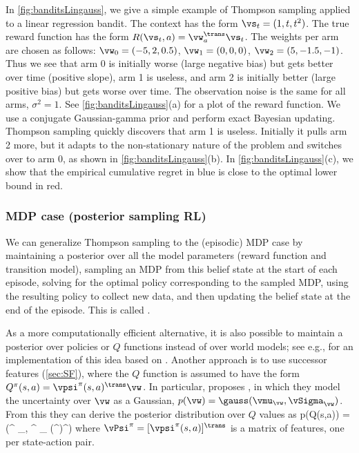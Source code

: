 In \cref{fig:banditsLingauss}, we give a simple
example of Thompson sampling applied to a linear regression bandit.
The context has the form $\vs_t =(1,t,t^2)$.
The true reward function has the form
$R(\vs_t,a) = \vw_a^\trans \vs_t$.
The weights per arm are chosen as follows:
$\vw_0 = (-5, 2, 0.5)$,
$\vw_1 = (0,0,0)$,
$\vw_2 = (5, -1.5, -1)$.
Thus we see that arm 0 is initially worse (large negative bias)
but gets better over time (positive slope),
arm 1 is useless,
and arm 2 is initially better (large positive bias)
but gets worse over time.
The observation noise is the same for all arms, $\sigma^2=1$.
See \cref{fig:banditsLingauss}(a) for a plot of the reward function.
We use a conjugate Gaussian-gamma prior and perform
exact Bayesian updating. Thompson sampling
quickly discovers that arm 1 is useless.
Initially it pulls arm 2  more,
but it adapts to the non-stationary nature of the problem
and switches over to arm 0,
as shown in 
\cref{fig:banditsLingauss}(b).
In \cref{fig:banditsLingauss}(c), we show that the empirical
cumulative regret in blue is close to the optimal
lower bound in red.

\subsubsection{MDP case (posterior sampling RL)}
\label{sec:PSRL}

We can generalize Thompson sampling to the (episodic) MDP case
by maintaining a posterior over all the model parameters
(reward function and transition model),
sampling an MDP from this belief state at the start of each episode,
solving for the optimal policy
corresponding to the sampled MDP,
using the resulting policy to collect new data,
and then updating the belief state at the end of the episode.
This is called 
\citep{Strens00,Osband2013,Russo2014,osband2017posterior,Wang2024}.



As a more computationally efficient alternative,
it is also possible to maintain a posterior over policies
or $Q$ functions instead of over world models;
see e.g., \citep{Osband2023TS} for an implementation of this idea
based on 
\citep{Osband2023epi}.
Another approach is to use successor features (\cref{sec:SF}),
where the $Q$ function is assumed to have the form
$Q^{\pi}(s,a) = \vpsi^{\pi}(s,a)^\trans \vw$.
In particular, \citep{Janz2019} proposes
,
in which they model the uncertainty over $\vw$
as a Gaussian,
$p(\vw) = \gauss(\vmu_{\vw}, \vSigma_{\vw})$.
From this they can derive the posterior distribution
over $Q$ values as
\be
p(Q(s,a)) = \gauss(\vPsi^{\pi} \vmu_{\vw}, \vPsi^{\pi} \vSigma_{\vw} (\vPsi^{\pi})^\trans)
\ee
where $\vPsi^{\pi}=[\vpsi^{\pi}(s,a)]^\trans$ is a matrix of features,
one per state-action pair.


